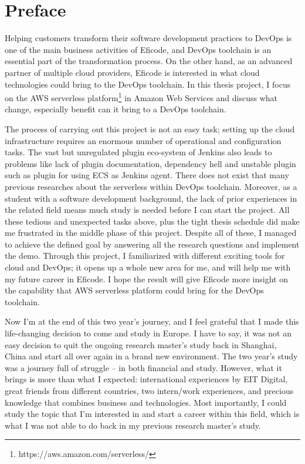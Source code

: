 \chapter*{Preface}
Helping customers transform their software development practices to DevOps is one of the main business activities of Eficode, and DevOps toolchain is an essential part of the transformation process.
On the other hand, as an advanced partner of multiple cloud providers, Eficode is interested in what cloud technologies could bring to the DevOps toolchain. In this thesis project, I focus on the AWS serverless platform\footnote{https://aws.amazon.com/serverless/} in Amazon Web Services and discuss what change, especially benefit can it bring to a DevOps toolchain.

The process of carrying out this project is not an easy task; setting up the cloud infrastructure requires an enormous number of operational and configuration tasks. The vast but unregulated plugin eco-system of Jenkins also leads to problems like lack of plugin documentation, dependency hell and unstable plugin such as plugin for using ECS as Jenkins agent. There does not exist that many previous researches about the serverless within DevOps toolchain. Moreover, as a student with a software development background, the lack of prior experiences in the related field means much study is needed before I can start the project. All these tedious and unexpected tasks above, plus the tight thesis schedule did make me frustrated in the middle phase of this project. Despite all of these, I managed to achieve the defined goal by answering all the research questions and implement the demo. Through this project, I familiarized with different exciting tools for cloud and DevOps; it opens up a whole new area for me, and will help me with my future career in Eficode. I hope the result will give Eficode more insight on the capability that AWS serverless platform could bring for the DevOps toolchain.
\vspace{1\baselineskip}

\noindent
Now I'm at the end of this two year's journey, and I feel grateful that I made this life-changing decision to come and study in Europe. I have to say, it was not an easy decision to quit the ongoing research master's study back in Shanghai, China and start all over again in a brand new environment. The two year's study was a journey full of struggle -- in both financial and study. However, what it brings is more than what I expected: international experiences by EIT Digital, great friends from different countries, two intern/work experiences, and precious knowledge that combines business and technologies. Most importantly, I could study the topic that I'm interested in and start a career within this field, which is what I was not able to do back in my previous research master's study.

